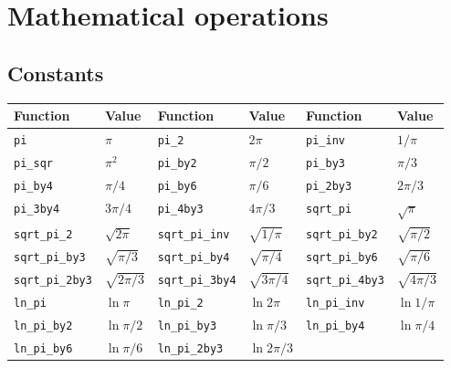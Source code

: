 \section{Mathematical operations}
\label{sec:Mathemtical operations}

\subsection{Constants}
\label{sub:Constants}

\begin{table}[t]
  \begin{tabu}{X[2l]X[l]X[2l]X[l]X[2l]X[l]}
    \toprule
    Function & Value &
    Function & Value &
    Function & Value \\
    \midrule
    \texttt{pi}             & $\pi$              &
    \texttt{pi\_2}          & $2\pi$             &
    \texttt{pi\_inv}        & $1/\pi$            \\
    \texttt{pi\_sqr}        & $\pi^2$            &
    \texttt{pi\_by2}        & $\pi/2$            &
    \texttt{pi\_by3}        & $\pi/3$            \\
    \texttt{pi\_by4}        & $\pi/4$            &
    \texttt{pi\_by6}        & $\pi/6$            &
    \texttt{pi\_2by3}       & $2\pi/3$           \\
    \texttt{pi\_3by4}       & $3\pi/4$           &
    \texttt{pi\_4by3}       & $4\pi/3$           &
    \texttt{sqrt\_pi}       & $\sqrt{\pi}$       \\
    \texttt{sqrt\_pi\_2}    & $\sqrt{2\pi}$      &
    \texttt{sqrt\_pi\_inv}  & $\sqrt{1/\pi}$     &
    \texttt{sqrt\_pi\_by2}  & $\sqrt{\pi/2}$     \\
    \texttt{sqrt\_pi\_by3}  & $\sqrt{\pi/3}$     &
    \texttt{sqrt\_pi\_by4}  & $\sqrt{\pi/4}$     &
    \texttt{sqrt\_pi\_by6}  & $\sqrt{\pi/6}$     \\
    \texttt{sqrt\_pi\_2by3} & $\sqrt{2\pi/3}$    &
    \texttt{sqrt\_pi\_3by4} & $\sqrt{3\pi/4}$    &
    \texttt{sqrt\_pi\_4by3} & $\sqrt{4\pi/3}$    \\
    \texttt{ln\_pi}         & $\ln{\pi}$         &
    \texttt{ln\_pi\_2}      & $\ln{2\pi}$        &
    \texttt{ln\_pi\_inv}    & $\ln{1/\pi}$       \\
    \texttt{ln\_pi\_by2}    & $\ln{\pi/2}$       &
    \texttt{ln\_pi\_by3}    & $\ln{\pi/3}$       &
    \texttt{ln\_pi\_by4}    & $\ln{\pi/4}$       \\
    \texttt{ln\_pi\_by6}    & $\ln{\pi/6}$       &
    \texttt{ln\_pi\_2by3}   & $\ln{2\pi/3}$      &

\end{tabu}
\end{table}
